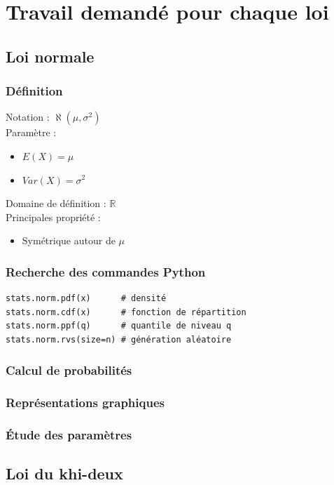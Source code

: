 \documentclass[rapport]{subfiles}
\begin{document}
	\section{Travail demandé pour chaque loi}
	
	\subsection{Loi normale}
	\subsubsection*{Définition}
	\noindent Notation : \(\aleph(\mu, \sigma^2)\)\\
	Paramètre :\begin{itemize}[label=$\Diamond$]
		\item \(E(X)= \mu\)
		\item \(Var(X)= \sigma^2\)
	\end{itemize}
	Domaine de définition : \(\mathbb{R}\)\\
	Principales propriété :\begin{itemize}[label=$\Diamond$]
		\item Symétrique autour de \(\mu\)
	\end{itemize}
	\subsubsection*{Recherche des commandes Python}
	\begin{verbatim}
stats.norm.pdf(x)      # densité
stats.norm.cdf(x)      # fonction de répartition
stats.norm.ppf(q)      # quantile de niveau q
stats.norm.rvs(size=n) # génération aléatoire
	\end{verbatim}
	\subsubsection*{Calcul de probabilités}
	\subsubsection*{Représentations graphiques}
	\subsubsection*{Étude des paramètres}
	
	\subsection{Loi du khi-deux}
\end{document}
